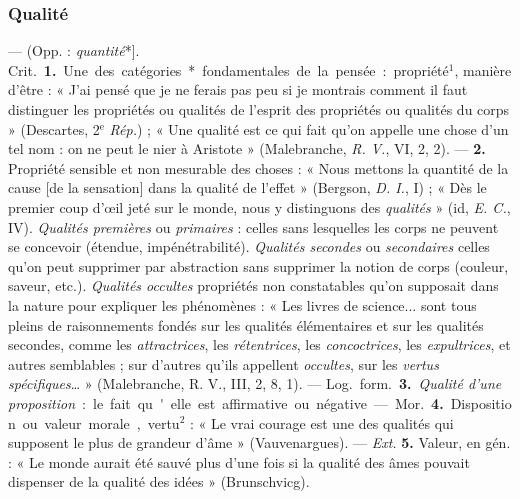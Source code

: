 \subsubsection{Qualité}
 — (Opp. : {\it quantité}*]. \si{Crit.} {\bf 1.} Une des
catégories* fondamentales de la pensée : propriété$^1$, manière d’être : «
J’ai pensé que je ne ferais pas peu si je montrais comment il faut distinguer
les propriétés ou qualités de l'esprit des propriétés ou qualités du corps
» (Descartes, 2$^\text{e}$ {\it Rép.}) ; « Une qualité est ce qui fait qu'on
appelle une chose d’un tel nom : on ne peut le nier à
Aristote » (Malebranche, {\it R. V.}, VI, 2, 2). — {\bf 2.} Propriété
sensible et non mesurable des choses : « Nous mettons la quantité de la cause
[de la sensation] dans la qualité de l'effet » (Bergson, {\it D. I.}, I) ; «
Dès le premier coup d'œil jeté sur le monde, nous y distinguons des {\it
qualités} » (id, {\it E. C.}, IV). {\it Qualités premières} ou {\it
primaires} : celles sans lesquelles les corps ne peuvent se concevoir
(étendue, impénétrabilité). {\it Qualités secondes} ou {\it secondaires}
celles qu'on peut supprimer par abstraction sans supprimer la notion de corps
(couleur, saveur, etc.). {\it Qualités occultes} propriétés non constatables
qu’on supposait dans la nature pour expliquer les phénomènes : « Les livres
de science... sont tous pleins de raisonnements fondés sur les qualités
élémentaires et sur les qualités secondes, comme les {\it attractrices}, les
{\it rétentrices}, les {\it concoctrices}, les {\it expultrices}, et autres
semblables ; sur d’autres qu'ils appellent {\it occultes}, sur les {\it
vertus spécifiques}… » (Malebranche, R. V., III, 2, 8, 1). — \si{Log.}
\si{form.} {\bf 3.} {\it Qualité d’une proposition} : le fait qu'elle est
affirmative ou négative.

— \si{Mor.} {\bf 4.} Disposition ou valeur morale, vertu$^2$ : « Le vrai
courage est une des qualités qui supposent le plus de grandeur d'âme
» (Vauvenargues). — {\it Ext.} {\bf 5.} Valeur, en gén. : « Le monde aurait
été sauvé plus d’une fois si la qualité des âmes pouvait dispenser de la
qualité des idées » (Brunschvicg).

\subsubsection{}
